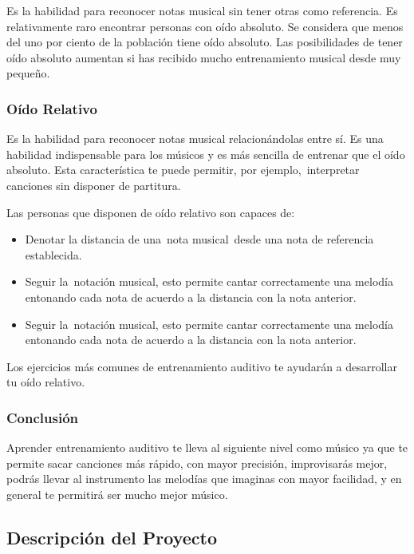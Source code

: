 \documentclass[12pt,twoside,titlepage]{report}
\begin{document}
Es la habilidad para reconocer notas musical sin tener otras como referencia. Es relativamente raro encontrar personas con oído absoluto. Se considera que menos del uno por ciento de la población tiene oído absoluto. Las posibilidades de tener oído absoluto aumentan si has recibido mucho entrenamiento musical desde muy pequeño.

\subsubsection{Oído Relativo}

Es la habilidad para reconocer notas musical relacionándolas entre sí. Es una habilidad indispensable para los músicos y es más sencilla de entrenar que el oído absoluto. Esta característica te puede permitir, por ejemplo, interpretar canciones sin disponer de partitura.

Las personas que disponen de oído relativo son capaces de:
\begin{itemize}
    \item Denotar la distancia de una nota musical desde una nota de referencia establecida.
    
    \item Seguir la notación musical, esto permite cantar correctamente una melodía entonando cada nota de acuerdo a la distancia con la nota anterior.
    
    \item Seguir la notación musical, esto permite cantar correctamente una melodía entonando cada nota de acuerdo a la distancia con la nota anterior.
\end{itemize}

Los ejercicios más comunes de entrenamiento auditivo te ayudarán a desarrollar tu oído relativo.

\subsubsection{Conclusión}

Aprender entrenamiento auditivo te lleva al siguiente nivel como músico ya que te permite sacar canciones más rápido, con mayor precisión, improvisarás mejor, podrás llevar al instrumento las melodías que imaginas con mayor facilidad, y en general te permitirá ser mucho mejor músico.

\subsection{Descripción del Proyecto}
\end{document}
